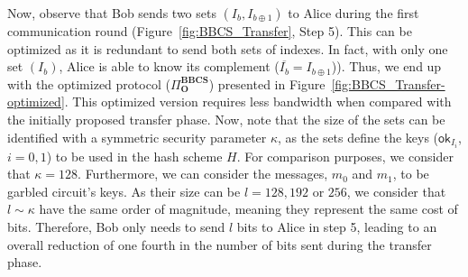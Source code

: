 Now, observe that Bob sends two sets $(I_b, I_{b\oplus 1})$ to Alice during the first communication round (Figure~\ref{fig:BBCS_Transfer}, Step 5). This can be optimized as it is redundant to send both sets of indexes. In fact, with only one set $(I_b)$, Alice is able to know its complement ($\overline{I_b} = I_{b\oplus 1}$)). Thus, we end up with the optimized protocol ($\Pi^{\textbf{BBCS}}_{\textbf{O}}$) presented in Figure~\ref{fig:BBCS_Transfer-optimized}. This optimized version requires less bandwidth when compared with the initially proposed transfer phase. Now, note that the size of the sets can be identified with a symmetric security parameter $\kappa$, as the sets define the keys ($\mathsf{ok}_{I_i}$, $i=0,1$) to be used in the hash scheme $H$. For comparison purposes, we consider that $\kappa = 128$. Furthermore, we can consider the messages, $m_0$ and $m_1$, to be garbled circuit's keys. As their size can be $l = 128, 192$ or $256$, we consider that $l\sim \kappa$ have the same order of magnitude, meaning they represent the same cost of bits. Therefore, Bob only needs to send $l$ bits to Alice in step 5, leading to an overall reduction of one fourth in the number of bits sent during the transfer phase. 

